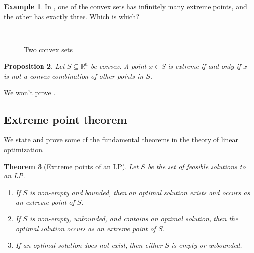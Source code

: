\documentclass[a4paper, 12pt]{article}
\numberwithin{equation}{section}
\numberwithin{figure}{section}
\newtheorem{thm}{Theorem}[section]
\newtheorem{prop}[thm]{Proposition}
\theoremstyle{definition}
\newtheorem{ex}[thm]{Example}
\newcommand{\R}{\mathbb{R}}
\begin{document}
\begin{ex}
	In , one of the convex sets has infinitely many extreme
	points, and the other has exactly three. Which is which?
	\begin{figure}
		\centering
		\begin{subfigure}{0.45\textwidth}
			\centering
		\end{subfigure}~%
		\begin{subfigure}{0.45\textwidth}
			\centering
		\end{subfigure}
		\caption{Two convex sets}
		\label{fig:2-convex}
	\end{figure}
\end{ex}

\begin{prop}\label{prop:extreme-convex}
	Let $S\subseteq \R^n$ be convex. A point $x\in S$ is extreme if and only if
	$x$ is not a convex combination of other points in $S$.
\end{prop}

We won't prove .

\subsection{Extreme point theorem}
\label{sec:extreme}

We state and prove some of the fundamental theorems in the theory of linear optimization. 

\begin{thm}[Extreme points of an LP]
	Let $S$ be the set of feasible solutions to an LP.
	\begin{enumerate}[label=$(\arabic*)$]
		\item If $S$ is non-empty and bounded, then an optimal solution exists
		and occurs as an extreme point of $S$.
		\item If $S$ is non-empty, unbounded, and contains an optimal solution,
		then the optimal solution occurs as an extreme point of $S$.
		\item If an optimal solution does not exist, then either $S$ is empty or
		unbounded.
	\end{enumerate}
\end{thm}
\end{document}

